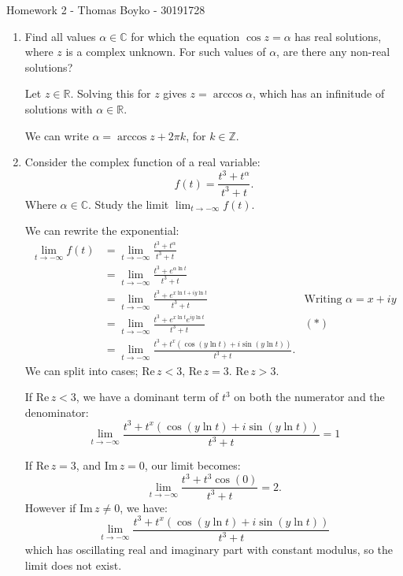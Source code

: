 \documentclass{article}
\begin{document}
    \huge Homework 2 - Thomas Boyko - 30191728
    \normalsize
\begin{enumerate} 
    \item Find all values $\alpha\in \mathbb{C}$ for which the equation $\cos z=\alpha$
        has real solutions, where $z$ is a complex unknown. For such values of
        $\alpha$, are there any non-real solutions?

        Let $z\in \mathbb{R}$. Solving this for $z$ gives $z=\arccos \alpha$, which has an 
        infinitude of solutions with $\alpha\in \mathbb{R}$.

        We can write $\alpha=\arccos z +2\pi k$, for $k\in \mathbb{Z}$.

    \item Consider the complex function of a real variable:
        \[
        f(t)=\frac{t^3+t^{\alpha}}{t^3+t}
        .\] 
        Where $\alpha\in \mathbb{C}$. Study the limit $\lim_{t \to -\infty} f(t)$.

        We can rewrite the exponential:
        \begin{align*}
            \lim_{t \to -\infty} f(t)&= \lim_{t \to -\infty}  \frac{t^3+t^{\alpha}}{t^3+t}\\
            &= \lim_{t \to -\infty}  \frac{t^3+e^{\alpha\ln t}}{t^3+t}\\
            &= \lim_{t \to -\infty}  \frac{t^3+e^{x\ln t+iy\ln t}}{t^3+t}&\text{Writing }\alpha=x+iy\\
            &= \lim_{t \to -\infty}  \frac{t^3+e^{x\ln t}e^{iy\ln t}}{t^3+t}&(*)\\
            &= \lim_{t \to -\infty} \frac{t^3+t^{x}(\cos(y\ln t)+i\sin(y\ln t))}{t^3+t}
        .\end{align*}
        We can split into cases; $\mathrm{Re}\,z<3$, $\mathrm{Re}\,z=3$. $\mathrm{Re}\,z> 3$.

        If $\mathrm{Re}\,z<3$, we have a dominant term of $t^3$ on both the numerator and
        the denominator: 
            $$\lim_{t \to -\infty} \frac{t^3+t^{x}(\cos(y\ln t)+i\sin(y\ln t))}{t^3+t}=1$$

        If $\mathrm{Re}\,z= 3$, and $\mathrm{Im}\,z=0$, our limit becomes:
        \[
            \lim_{t \to -\infty} \frac{t^3+t^{3}\cos(0)}{t^3+t}=2
        .\]
        However if $\mathrm{Im}\,z\neq 0$, we have:
            $$\lim_{t \to -\infty} \frac{t^3+t^{x}(\cos(y\ln t)+i\sin(y\ln t))}{t^3+t}$$
        which has oscillating real and imaginary part with constant modulus, 
        so the limit does not exist.


\end{enumerate}
\end{document}
